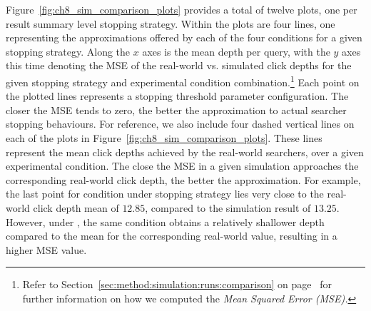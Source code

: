 Figure~\ref{fig:ch8_sim_comparison_plots} provides a total of twelve plots, one per result summary level stopping strategy. Within the plots are four lines, one representing the approximations offered by each of the four conditions for a given stopping strategy. Along the $x$ axes is the mean depth per query, with the $y$ axes this time denoting the MSE of the real-world vs. simulated click depths for the given stopping strategy and experimental condition combination.\footnote{Refer to Section~\ref{sec:method:simulation:runs:comparison} on page~\pageref{sec:method:simulation:runs:comparison} for further information on how we computed the \emph{Mean Squared Error (MSE).}} Each point on the plotted lines represents a stopping threshold parameter configuration. The closer the MSE tends to zero, the better the approximation to actual searcher stopping behaviours. For reference, we also include four dashed vertical lines on each of the plots in Figure~\ref{fig:ch8_sim_comparison_plots}. These lines represent the mean click depths achieved by the real-world searchers, over a given experimental condition. The close the MSE in a given simulation approaches the corresponding real-world click depth, the better the approximation. For example, the last point for condition  under stopping strategy  lies very close to the real-world click depth mean of $12.85$, compared to the simulation result of $13.25$. However, under , the same condition obtains a relatively shallower depth compared to the mean for the corresponding real-world value, resulting in a higher MSE value.

